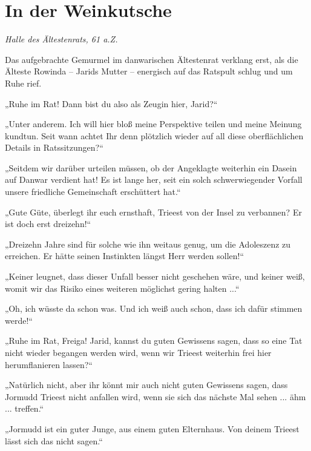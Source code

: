 \newpage
\section{In der Weinkutsche}










\textit{Halle des Ältestenrats, 61 a.Z.}\bigskip



Das aufgebrachte Gemurmel im danwarischen Ältestenrat verklang erst, als die Älteste Rowinda – Jarids Mutter – energisch auf das Ratspult schlug und um Ruhe rief.

„Ruhe im Rat! Dann bist du also als Zeugin hier, Jarid?“

„Unter anderem. Ich will hier bloß meine Perspektive teilen und meine Meinung kundtun. Seit wann achtet Ihr denn plötzlich wieder auf all diese oberflächlichen Details in Ratssitzungen?“

„Seitdem wir darüber urteilen müssen, ob der Angeklagte weiterhin ein Dasein auf Danwar verdient hat! Es ist lange her, seit ein solch schwerwiegender Vorfall unsere friedliche Gemeinschaft erschüttert hat.“

„Gute Güte, überlegt ihr euch ernsthaft, Trieest von der Insel zu verbannen? Er ist doch erst dreizehn!“

„Dreizehn Jahre sind für solche wie ihn weitaus genug, um die Adoleszenz zu erreichen. Er hätte seinen Instinkten längst Herr werden sollen!“

„Keiner leugnet, dass dieser Unfall besser nicht geschehen wäre, und keiner weiß, womit wir das Risiko eines weiteren möglichst gering halten ...“

„Oh, ich wüsste da schon was. Und ich weiß auch schon, dass ich dafür stimmen werde!“

„Ruhe im Rat, Freiga! Jarid, kannst du guten Gewissens sagen, dass so eine Tat nicht wieder begangen werden wird, wenn wir Trieest weiterhin frei hier herumflanieren lassen?“

„Natürlich nicht, aber ihr könnt mir auch nicht guten Gewissens sagen, dass Jormudd Trieest nicht anfallen wird, wenn sie sich das nächste Mal sehen ... ähm ... treffen.“

„Jormudd ist ein guter Junge, aus einem guten Elternhaus. Von deinem Trieest lässt sich das nicht sagen.“\bigskip








